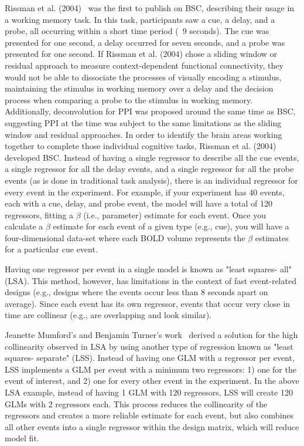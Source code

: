 \documentclass[phd,appendix,figures]{uithesis}
\begin{document}
Rissman et al. (2004)~\cite{Rissman2004} was the first to publish on BSC,
describing their usage in a working memory task.
In this task, participants saw a cue, a delay, and a probe, all occurring
within a short time period (~9 seconds).
The cue was presented for one second, a delay occurred for seven seconds,
and a probe was presented for one second.
If Rissman et al. (2004) chose a sliding window or residual approach to measure context-dependent functional connectivity,
they would not be able to dissociate the processes of visually encoding a stimulus,
maintaining the stimulus in working memory over a delay and the decision process when comparing a
probe to the stimulus in working memory.
Additionally, deconvolution for PPI was proposed around the same time as BSC,
suggesting PPI at the time was subject to the same limitations as
the sliding window and residual approaches.
In order to identify the brain areas working together to complete those individual cognitive tasks,
Rissman et al. (2004) developed BSC.
Instead of having a single regressor to describe all the cue events,
a single regressor for all the delay events, and a single regressor for all the
probe events (as is done in traditional task analysis),
there is an individual regressor for every event in the experiment.
For example, if your experiment has 40 events, each with a cue, delay, and
probe event, the model will have a total of 120 regressors, fitting a $\beta$
(i.e., parameter) estimate for each event.
Once you calculate a $\beta$ estimate for each event of a given type
(e.g., cue), you will have a four-dimensional data-set where each BOLD volume
represents the $\beta$ estimates for a particular cue event.

Having one regressor per event in a single model is known as "least squares- all" (LSA).
This method, however, has limitations in the context of fast event-related
designs (e.g., designs where the events occur less than 8
seconds apart on average).
Since each event has its own regressor, events that occur very close in time
are collinear (e.g., are overlapping and look similar).

Jeanette Mumford's and Benjamin Turner's work~\cite{Turner2010,Mumford2012} derived a solution for
the high collinearity observed in LSA by using another
type of regression known as "least squares- separate" (LSS).
Instead of having one GLM with a regressor per event,
LSS implements a GLM per event with a minimum two regressors:
1) one for the event of interest, and 2) one for every other event in the
experiment.
In the above LSA example, instead of having 1 GLM with 120 regressors,
LSS will create 120 GLMs with 2 regressors each.
This process reduces the collinearity of the regressors and creates a more reliable
estimate for each event, but also combines all other events into a single regressor
within the design matrix, which will reduce model fit.
\end{document}
